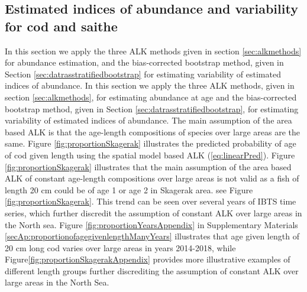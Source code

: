 \documentclass[a4paper 12pt]{article}
\numberwithin{equation}{section}
\newcommand{\nat}[1]{\textcolor{blue}{#1}}
\begin{document}

\subsection{Estimated indices of abundance and variability for cod and saithe}
\label{sec:codandsaitheresults}
In this section we apply the three ALK methods given in section \ref{sec:alkmethods} for abundance estimation, and the bias-corrected bootstrap method, given in Section \ref{sec:datrasstratifiedbootstrap} for estimating variability of estimated indices of abundance. In this section we apply the three ALK methods, given in section \ref{sec:alkmethods}, for estimating abundance at age and the bias-corrected bootstrap method, given in Section \ref{sec:datrasstratifiedbootstrap}, for estimating variability of estimated indices of abundance.  The main assumption of the area based ALK is that the age-length compositions of species over large areas are the same. Figure \ref{fig:proportionSkagerak} illustrates the predicted probability of age of cod given length using the spatial model based ALK  (\ref{eq:linearPred}).  Figure \ref{fig:proportionSkagerak} illustrates that the main assumption of the area based ALK of constant age-length compositions over large areas is not valid as a fish of length 20 cm could be of age 1 or age 2 in Skagerak area.  see Figure \ref{fig:proportionSkagerak}.  This trend can be seen over several years of IBTS time series, which further discredit the assumption of constant ALK over large areas in the North sea. Figure \ref{fig:proportionYearsAppendix} in Supplementary Materials \ref{secAp:proportionofagegivenlengthManyYears} illustrates that age given length of 20 cm long cod varies over large areas in years 2014-2018, while Figure\ref{fig:proportionSkagerakAppendix} provides more illustrative examples of different length groups further discrediting the assumption of constant ALK over large areas in the North Sea.
\end{document}
